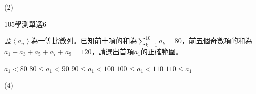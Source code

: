 \begin{QUESTIONS}
\begin{QUESTION}
        \begin{QANS}
            (2)
        \end{QANS}
        \begin{QSOLLIST}
        \end{QSOLLIST}
        \begin{QEMPTYSPACE}
        \end{QEMPTYSPACE}
    \end{QUESTION}
    \begin{QUESTION}
        \begin{ExamInfo}{105}{學測}{單選}{6}
        \end{ExamInfo}
        \begin{ExamAnsRateInfo}{28}{53}{22}{9}
        \end{ExamAnsRateInfo}
        \begin{QBODY}
            設$\left\langle {{a}_{n}} \right\rangle $為一等比數列。已知前十項的和為$\sum\limits_{k=1}^{10}{{{a}_{k}}}=80$，前五個奇數項的和為${{a}_{1}}+{{a}_{3}}+{{a}_{5}}+{{a}_{7}}+{{a}_{9}}=120$，請選出首項${{a}_{1}}$的正確範圍。
			\begin{QOPS}
				\QOP ${{a}_{1}}<80$
				\QOP $80\le {{a}_{1}}<90$
				\QOP $90\le {{a}_{1}}<100$
				\QOP $100\le {{a}_{1}}<110$
				\QOP $110\le {{a}_{1}}$
			\end{QOPS}
        \end{QBODY}
        \begin{QFROMS}
        \end{QFROMS}
        \begin{QTAGS}\end{QTAGS}
        \begin{QANS}
            (4)
        \end{QANS}
        \begin{QSOLLIST}
        \end{QSOLLIST}
        \begin{QEMPTYSPACE}
        \end{QEMPTYSPACE}
    \end{QUESTION}
\end{QUESTIONS}
